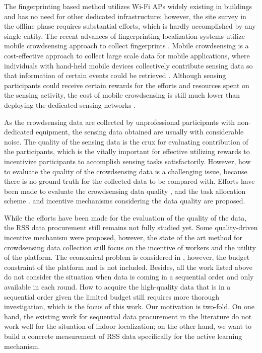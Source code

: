 \documentclass[10pt,conference,compsocconf,letterpaper]{IEEEtran}
\begin{document}
The fingerprinting based method utilizes Wi-Fi APs widely existing in buildings and has no need for other dedicated infrastructure; however, the site survey in the offline phase requires substantial efforts, which is hardly accomplished by any single entity. The recent advances of fingerprinting localization systems utilize mobile crowdsensing approach to collect fingerprints \cite{wen2015fundamental, Chenshu14, luo2014piloc, shen2013walkie, ez10, Chintalapudi10}. Mobile crowdsensing is a cost-effective approach to collect large scale data for mobile applications, where individuals with hand-held mobile devices collectively contribute sensing data so that information of certain events could be retrieved \cite{crowdsensing, postedpricing}. Although sensing participants could receive certain rewards for the efforts and resources spent on the sensing activity, the cost of mobile crowdsensing is still much lower than deploying the dedicated sensing networks \cite{ crowdsensing}. 


As the crowdsensing data are collected by unprofessional participants with non-dedicated equipment, the sensing data obtained are usually with considerable noise. The quality of the sensing data is the crux for evaluating contribution of the participants, which is the vitally important for effective utilizing rewards to incentivize participants to accomplish sensing tasks satisfactorily. However, how to evaluate the quality of the crowdsensing data is a challenging issue, because there is no ground truth for the collected data to be compared with. Efforts have been made to evaluate the crowdsensing data quality \cite{ Crowdloc14}, and the task allocation scheme \cite{ Taskselection15, recruit}. and incentive mechanisms considering the data quality are proposed. 

While the efforts have been made for the evaluation of the quality of the data, the RSS data procurement still remains not fully studied yet. Some quality-driven incentive mechanism\cite{Lbs2, noise,Pengdan15, incentive, Incentive2} were proposed, however, the state of the art method for crowdsensing data collection still focus on the incentive of workers and the utility of the platform. The economical problem is considered in \cite{Pengdan15}, however, the budget constraint of the platform and is not included. Besides, all the work listed above do not consider the situation when data is coming in a sequential order and only available in each round. How to acquire the high-quality data that is in a sequential order given the limited budget still requires more thorough investigation, which is the focus of this work. Our motivation is two-fold. On one hand, the existing work for sequential data procurement in the literature \cite{abernethy2015low}do not work well for the situation of indoor localization; on the other hand, we want to build a concrete measurement of RSS data specifically for the active learning mechanism. 
\end{document}
